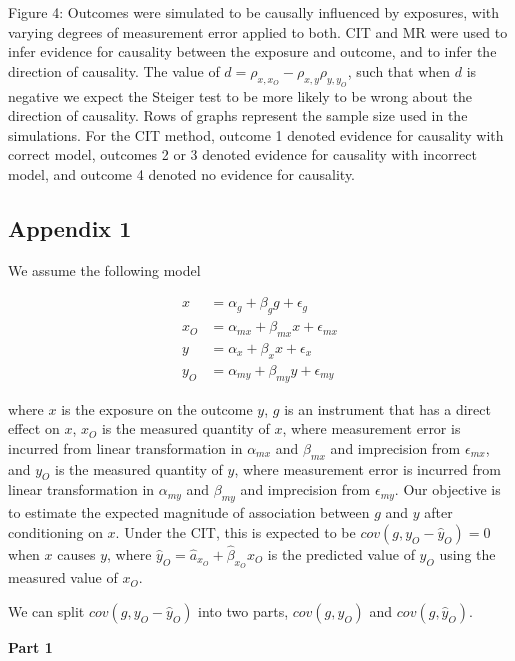 \documentclass[]{article}
\begin{document}
Figure 4: Outcomes were simulated to be causally influenced by
exposures, with varying degrees of measurement error applied to both.
CIT and MR were used to infer evidence for causality between the
exposure and outcome, and to infer the direction of causality. The value
of \(d = \rho_{x, x_O} - \rho_{x,y}\rho_{y,y_O}\), such that when \(d\)
is negative we expect the Steiger test to be more likely to be wrong
about the direction of causality. Rows of graphs represent the sample
size used in the simulations. For the CIT method, outcome 1 denoted
evidence for causality with correct model, outcomes 2 or 3 denoted
evidence for causality with incorrect model, and outcome 4 denoted no
evidence for causality.

\newpage

\subsection{Appendix 1}\label{appendix-1}

We assume the following model

\[
\begin{aligned}
x   & = \alpha_g + \beta_g g + \epsilon_g \\
x_O & = \alpha_{mx} + \beta_{mx} x + \epsilon_{mx} \\
y   & = \alpha_x + \beta_x x + \epsilon_x \\
y_O & = \alpha_{my} + \beta_{my} y + \epsilon_{my}
\end{aligned}
\]

where \(x\) is the exposure on the outcome \(y\), \(g\) is an instrument
that has a direct effect on \(x\), \(x_O\) is the measured quantity of
\(x\), where measurement error is incurred from linear transformation in
\(\alpha_{mx}\) and \(\beta_{mx}\) and imprecision from
\(\epsilon_{mx}\), and \(y_O\) is the measured quantity of \(y\), where
measurement error is incurred from linear transformation in
\(\alpha_{my}\) and \(\beta_{my}\) and imprecision from
\(\epsilon_{my}\). Our objective is to estimate the expected magnitude
of association between \(g\) and \(y\) after conditioning on \(x\).
Under the CIT, this is expected to be \(cov(g, y_O - \hat{y}_O) = 0\)
when \(x\) causes \(y\), where
\(\hat{y}_O = \hat{a}_{x_O} + \hat{\beta}_{x_O} x_O\) is the predicted
value of \(y_O\) using the measured value of \(x_O\).

We can split \(cov(g, y_O - \hat{y}_O)\) into two parts, \(cov(g, y_O)\)
and \(cov(g, \hat{y}_O)\).

\textbf{Part 1}
\end{document}
